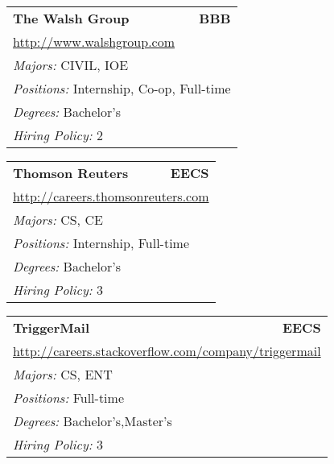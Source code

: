 \documentclass[twoside]{article}
\begin{document}
\begin{center}
\begin{multicols}{3}
\begin{FlushLeft}
\begin{minipage}{.9\columnwidth}
\end{minipage}
 
\begin{minipage}{.9\columnwidth}\begin{tabularx}{.95\columnwidth}{Xr}
                 {\Large\bf The Walsh Group} & {\Large\bf BBB}\\
    \multicolumn{2}{p{.95\columnwidth}}{\url{http://www.walshgroup.com}}\\
    \multicolumn{2}{p{.95\columnwidth}}{\emph{Majors:} CIVIL, IOE}\\
    \multicolumn{2}{p{.95\columnwidth}}{\emph{Positions:} Internship, Co-op, Full-time}\\
    \multicolumn{2}{p{.95\columnwidth}}{\emph{Degrees:} Bachelor's}\\
    \multicolumn{2}{p{.95\columnwidth}}{\emph{Hiring Policy:} 2}\\
    \end{tabularx}
    
\end{minipage}
 
\begin{minipage}{.9\columnwidth}\begin{tabularx}{.95\columnwidth}{Xr}
                 {\Large\bf Thomson Reuters} & {\Large\bf EECS}\\
    \multicolumn{2}{p{.95\columnwidth}}{\url{http://careers.thomsonreuters.com}}\\
    \multicolumn{2}{p{.95\columnwidth}}{\emph{Majors:} CS, CE}\\
    \multicolumn{2}{p{.95\columnwidth}}{\emph{Positions:} Internship, Full-time}\\
    \multicolumn{2}{p{.95\columnwidth}}{\emph{Degrees:} Bachelor's}\\
    \multicolumn{2}{p{.95\columnwidth}}{\emph{Hiring Policy:} 3}\\
    \end{tabularx}
    
\end{minipage}
 
\begin{minipage}{.9\columnwidth}\begin{tabularx}{.95\columnwidth}{Xr}
                 {\Large\bf TriggerMail} & {\Large\bf EECS}\\
    \multicolumn{2}{p{.95\columnwidth}}{\url{http://careers.stackoverflow.com/company/triggermail}}\\
    \multicolumn{2}{p{.95\columnwidth}}{\emph{Majors:} CS, ENT}\\
    \multicolumn{2}{p{.95\columnwidth}}{\emph{Positions:} Full-time}\\
    \multicolumn{2}{p{.95\columnwidth}}{\emph{Degrees:} Bachelor's,Master's}\\
    \multicolumn{2}{p{.95\columnwidth}}{\emph{Hiring Policy:} 3}\\
    \end{tabularx}
    

\end{minipage}
\end{FlushLeft}
\end{multicols}
\end{center}
\end{document}
